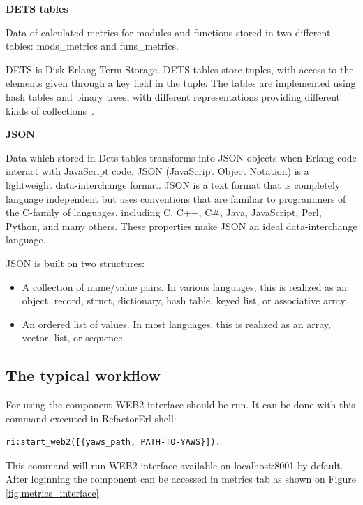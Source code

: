 \textbf{DETS tables}

Data of calculated metrics for modules and functions stored in two different tables: mods\_metrics and funs\_metrics.

DETS is Disk Erlang Term Storage. DETS tables store tuples, with access to the elements given through a  key field in the tuple. The tables are implemented using hash tables and binary trees, with different representations providing different kinds of collections~\cite{erland_o'reilly}.

\textbf{JSON}

Data which stored in Dets tables transforms into JSON objects when Erlang code interact with JavaScript code.
JSON (JavaScript Object Notation) is a lightweight data-interchange format.
JSON is a text format that is completely language independent but uses conventions that are familiar to programmers of the C-family of languages, including C, C++, C\#, Java, JavaScript, Perl, Python, and many others. These properties make JSON an ideal data-interchange language.

JSON is built on two structures:
\begin{itemize}
	\item A collection of name/value pairs. In various languages, this is realized as an object, record, struct, dictionary, hash table, keyed list, or associative array.
	\item An ordered list of values. In most languages, this is realized as an array, vector, list, or sequence.
\end{itemize}

\subsection{The typical workflow}

For using the component WEB2 interface should be run. It can be done with this command executed in RefactorErl shell:

\begin{lstlisting}[frame=none, numbers=none]
	ri:start_web2([{yaws_path, PATH-TO-YAWS}]).
\end{lstlisting}

This command will run WEB2 interface available on localhost:8001 by default. After loginning the component can be accessed in metrics tab as shown on Figure \ref{fig:metrics_interface}

